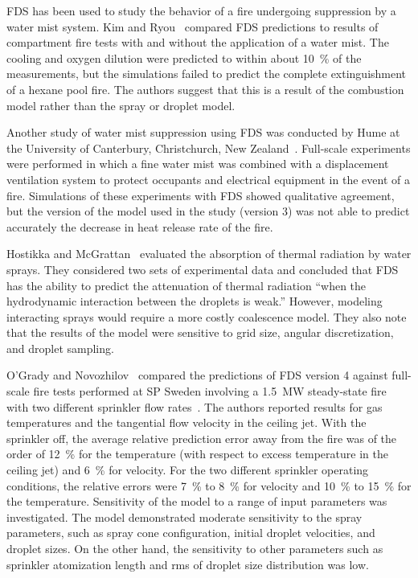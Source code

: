 FDS  has  been  used  to  study  the behavior  of  a  fire  undergoing suppression     by     a    water     mist     system.     Kim     and
Ryou~\cite{Kim:BE2003,Kim:IJACR2004}   compared  FDS   predictions  to results of compartment fire tests  with and without the application of a water
mist. The cooling and oxygen dilution were predicted to within about 10~\% of the measurements, but the simulations failed to predict the complete
extinguishment of a hexane pool fire. The authors suggest that this is a result of the combustion model rather than the spray or droplet model.

Another study  of water  mist suppression using  FDS was  conducted by Hume   at   the    University   of   Canterbury,   Christchurch,   New
Zealand~\cite{Hume:Masters}. Full-scale  experiments were performed in which a fine  water mist was combined with  a displacement ventilation system
to protect occupants and electrical equipment in the event of a fire.  Simulations of  these experiments  with FDS  showed qualitative agreement, but
the version of the  model used in the study (version 3) was not able  to predict accurately the decrease  in heat release rate of the fire.

Hostikka    and   McGrattan~\cite{Hostikka:FSJ2006}    evaluated   the absorption of  thermal radiation by water sprays.  They considered two sets of
experimental data and concluded  that FDS has  the ability to predict the  attenuation of thermal radiation  ``when the hydrodynamic interaction
between   the  droplets  is   weak.''  However,  modeling interacting sprays would require a more costly coalescence model. They also note that  the
results of the model were  sensitive to grid size, angular discretization, and droplet sampling.

O'Grady and Novozhilov~\cite{OGrady:CST} compared the predictions of FDS version 4
against full-scale fire tests performed at SP Sweden involving a 1.5~MW steady-state fire with two different
sprinkler flow rates~\cite{Ingason:1}.
The authors reported results for gas temperatures and the tangential flow velocity in the
ceiling jet. With the sprinkler off, the average relative prediction error away from the fire
was of the order of 12~\% for the temperature (with respect to excess temperature in the
ceiling jet) and 6~\% for velocity. For the two different sprinkler operating conditions,
the relative errors were 7~\% to 8~\% for velocity and 10~\% to 15~\% for the temperature.
Sensitivity of the model to a range of input parameters was investigated.
The model demonstrated moderate sensitivity to the spray parameters,
such as spray cone configuration, initial droplet velocities, and droplet sizes.
On the other hand, the sensitivity to other parameters such as
sprinkler atomization length and rms of droplet size distribution was low.



